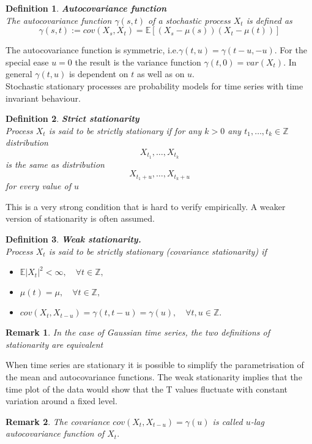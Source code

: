 \documentclass{book}
\newtheorem{definition}{Definition}[section]
\newtheorem{remark}{Remark}[section]
\begin{document}
\begin{definition}\textbf{Autocovariance function}\\
The autocovariance function $\gamma(s,t)$ of a stochastic process $X_{t}$ is defined as
$$
\gamma(s,t):=cov(X_{s},X_{t})=\mathbb{E}[(X_{s}-\mu(s))(X_{t}-\mu(t))]
$$
\end{definition}
The autocovariance function is symmetric, i.e.$\gamma(t,u)=\gamma(t-u,-u)$. For the special ease $u=0$ the result is the variance function $\gamma(t,0)=var(X_{t})$. In general $\gamma(t,u)$ is dependent on $t$ as well as on $u$.\\
Stochastic stationary processes are probability models for time series with time invariant behaviour. 
\begin{definition}\textbf{Strict stationarity}\\
Process $X_{t}$ is said to be strictly stationary if for any $k>0$ any $t_{1},\dots,t_{k}\in \mathbb{Z}$ distribution 
$$
X_{t_{1}},\dots,X_{t_{k}}
$$
is the same as distribution 
$$
X_{t_{1}+u},\dots,X_{t_{k}+u}
$$
for every value of $u$
\end{definition}
This is a very strong condition that is hard to verify empirically. A weaker version of stationarity is often assumed.
\begin{definition}\textbf{Weak stationarity.}\\
Process $X_{t}$ is said to be strictly stationary (covariance stationarity) if
\begin{itemize}
\item $\mathbb{E}|X_{t}|^{2}<\infty,\quad \forall t\in\mathbb{Z},$
\item $\mu(t)=\mu,\quad \forall t\in\mathbb{Z},$
\item $cov(X_{t},X_{t-u})=\gamma(t,t-u)=\gamma(u),\quad \forall t,u\in\mathbb{Z}.$
\end{itemize}
\end{definition}
\begin{remark}
In the case of Gaussian time series, the two definitions of stationarity are equivalent  
\end{remark}
When time series are stationary it is possible to simplify the parametrisation of the mean and autocovariance functions. The weak stationarity implies that the time plot of the data would show that the T values fluctuate with constant variation around a fixed level.
\begin{remark}
The covariance $cov(X_{t},X_{t-u})=\gamma(u)$ is called $u$-lag autocovariance function of $X_{t}.$
\end{remark}
\end{document}
